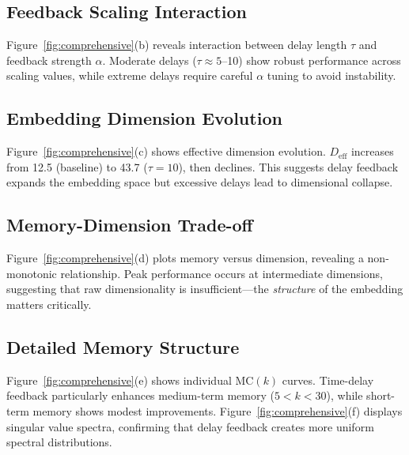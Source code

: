 \documentclass[11pt]{article}
\begin{document}
\subsection{Feedback Scaling Interaction}

Figure~\ref{fig:comprehensive}(b) reveals interaction between delay length $\tau$ and feedback strength $\alpha$. Moderate delays ($\tau \approx 5$--10) show robust performance across scaling values, while extreme delays require careful $\alpha$ tuning to avoid instability.

\subsection{Embedding Dimension Evolution}

Figure~\ref{fig:comprehensive}(c) shows effective dimension evolution. $D_{\text{eff}}$ increases from 12.5 (baseline) to 43.7 ($\tau=10$), then declines. This suggests delay feedback expands the embedding space but excessive delays lead to dimensional collapse.

\subsection{Memory-Dimension Trade-off}

Figure~\ref{fig:comprehensive}(d) plots memory versus dimension, revealing a non-monotonic relationship. Peak performance occurs at intermediate dimensions, suggesting that raw dimensionality is insufficient—the \textit{structure} of the embedding matters critically.

\subsection{Detailed Memory Structure}

Figure~\ref{fig:comprehensive}(e) shows individual MC$(k)$ curves. Time-delay feedback particularly enhances medium-term memory ($5 < k < 30$), while short-term memory shows modest improvements. Figure~\ref{fig:comprehensive}(f) displays singular value spectra, confirming that delay feedback creates more uniform spectral distributions.
\end{document}
